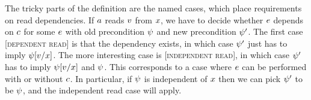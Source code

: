 \documentclass[conference]{IEEEtran}
\theoremstyle{plain}
\theoremstyle{definition}
\begin{document}

The tricky parts of the
definition are the named cases, which place requirements on read
dependencies.  If $a$ reads $v$ from $x$, we have to
decide whether $e$ depends on $c$ for some $e$ with old
precondition $\psi$ and new precondition $\psi'$. The first case
\textsc{[dependent read]} is that the dependency exists, in which case
$\psi'$ just has to imply $\psi[v/x]$. The more interesting 
case is \textsc{[independent read]}, in which case $\psi'$ has to imply
$\psi[v/x]$ and $\psi$. This corresponds to a case where
$e$ can be performed with or without $c$.
In particular, if $\psi$ is independent of $x$ then we can pick
$\psi'$ to be $\psi$, and the independent read case will apply.
\end{document}
